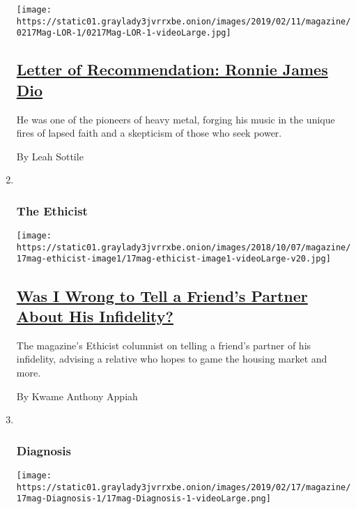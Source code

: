 \begin{enumerate}
  \texttt{[image: https://static01.graylady3jvrrxbe.onion/images/2019/02/11/magazine/0217Mag-LOR-1/0217Mag-LOR-1-videoLarge.jpg]}

  \hypertarget{letter-of-recommendation-ronnie-james-dio}{%
  \subsection{\texorpdfstring{\href{/2019/02/12/magazine/letter-of-recommendation-ronnie-james-dio.html}{Letter
  of Recommendation: Ronnie James
  Dio}}{Letter of Recommendation: Ronnie James Dio}}\label{letter-of-recommendation-ronnie-james-dio}}

  He was one of the pioneers of heavy metal, forging his music in the
  unique fires of lapsed faith and a skepticism of those who seek power.

  By Leah Sottile
\item ~
  \hypertarget{the-ethicist}{%
  \subsubsection{The Ethicist}\label{the-ethicist}}

  \texttt{[image: https://static01.graylady3jvrrxbe.onion/images/2018/10/07/magazine/17mag-ethicist-image1/17mag-ethicist-image1-videoLarge-v20.jpg]}

  \hypertarget{was-i-wrong-to-tell-a-friends-partner-about-his-infidelity}{%
  \subsection{\texorpdfstring{\href{/2019/02/12/magazine/was-i-wrong-to-tell-a-friends-partner-about-his-infidelity.html}{Was
  I Wrong to Tell a Friend's Partner About His
  Infidelity?}}{Was I Wrong to Tell a Friend's Partner About His Infidelity?}}\label{was-i-wrong-to-tell-a-friends-partner-about-his-infidelity}}

  The magazine's Ethicist columnist on telling a friend's partner of his
  infidelity, advising a relative who hopes to game the housing market
  and more.

  By Kwame Anthony Appiah
\item ~
  \hypertarget{diagnosis}{%
  \subsubsection{Diagnosis}\label{diagnosis}}

  \texttt{[image: https://static01.graylady3jvrrxbe.onion/images/2019/02/17/magazine/17mag-Diagnosis-1/17mag-Diagnosis-1-videoLarge.png]}


\end{enumerate}
